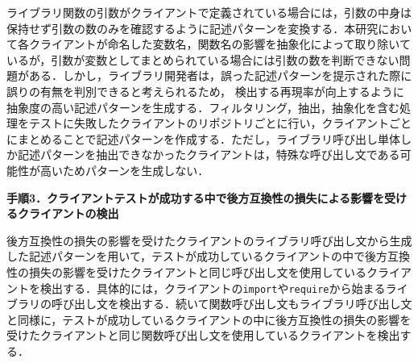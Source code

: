 \documentclass[T,J]{fose} %
\begin{document}
ライブラリ関数の引数がクライアントで定義されている場合には，引数の中身は保持せず引数の数のみを確認するように記述パターンを変換する．本研究において各クライアントが命名した変数名，関数名の影響を抽象化によって取り除いているが，引数が変数としてまとめられている場合には引数の数を判断できない問題がある．しかし，ライブラリ開発者は，誤った記述パターンを提示された際に誤りの有無を判別できると考えられるため，
検出する再現率が向上するように抽象度の高い記述パターンを生成する．フィルタリング，抽出，抽象化を含む処理をテストに失敗したクライアントのリポジトリごとに行い，クライアントごとにまとめることで記述パターンを作成する．ただし，ライブラリ呼び出し単体しか記述パターンを抽出できなかったクライアントは，特殊な呼び出し文である可能性が高いためパターンを生成しない．


\noindent\textbf{手順3．クライアントテストが成功する中で後方互換性の損失による影響を受けるクライアントの検出}

後方互換性の損失の影響を受けたクライアントのライブラリ呼び出し文から生成した記述パターンを用いて，テストが成功しているクライアントの中で後方互換性の損失の影響を受けたクライアントと同じ呼び出し文を使用しているクライアントを検出する．具体的には，クライアントの\texttt{import}や\texttt{require}から始まるライブラリの呼び出し文を検出する．続いて関数呼び出し文もライブラリ呼び出し文と同様に，テストが成功しているクライアントの中に後方互換性の損失の影響を受けたクライアントと同じ関数呼び出し文を使用しているクライアントを検出する．



\begin{table}[t]
    \caption{分析対象としたライブラリ}
    \label{table:dataset}
    \centering
\end{table}
\end{document}
